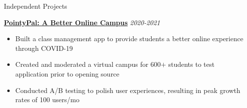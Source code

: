 \documentclass{resume/resume}
\begin{document}
%
%
%
\begin{rSection}{Independent Projects}
    

    \href{https://github.com/UtahTriangle/pointypal}{\bf PointyPal: A Better Online Campus} \hfill {\em 2020-2021}
    \vspace{-6pt}
    \begin{itemize}[nosep]
        \item Built a class management app to provide students a better online experience through COVID-19
        \item Created and moderated a virtual campus for 600$+$ students to test application prior to opening source 
        \item Conducted A/B testing to polish user experiences, resulting in peak growth rates of 100 users/mo
    \end{itemize}



\end{rSection}
\end{document}
